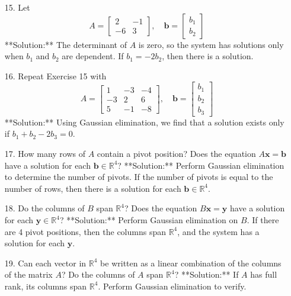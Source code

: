 \documentclass[12pt]{article}
\theoremstyle{definition}
\begin{document}
{\color{red}
\begin{enumerate}
    \item[15.] 
    Let 
    \[
    A = \begin{bmatrix} 2 & -1 \\ -6 & 3 \end{bmatrix}, \quad \mathbf{b} = \begin{bmatrix} b_1 \\ b_2 \end{bmatrix}
    \]
    **Solution:** The determinant of \( A \) is zero, so the system has solutions only when \( b_1 \) and \( b_2 \) are dependent. If \( b_1 = -2b_2 \), then there is a solution.
    
    \item[16.]
    Repeat Exercise 15 with 
    \[
    A = \begin{bmatrix} 1 & -3 & -4 \\ -3 & 2 & 6 \\ 5 & -1 & -8 \end{bmatrix}, \quad \mathbf{b} = \begin{bmatrix} b_1 \\ b_2 \\ b_3 \end{bmatrix}
    \]
    **Solution:** Using Gaussian elimination, we find that a solution exists only if \( b_1 + b_2 - 2b_3 = 0 \).

    \item[17.]
    How many rows of \( A \) contain a pivot position? Does the equation \( A\mathbf{x} = \mathbf{b} \) have a solution for each \( \mathbf{b} \in \mathbb{R}^4 \)?
    **Solution:** Perform Gaussian elimination to determine the number of pivots. If the number of pivots is equal to the number of rows, then there is a solution for each \( \mathbf{b} \in \mathbb{R}^4 \).
    
    \item[18.]
    Do the columns of \( B \) span \( \mathbb{R}^4 \)? Does the equation \( B\mathbf{x} = \mathbf{y} \) have a solution for each \( \mathbf{y} \in \mathbb{R}^4 \)?
    **Solution:** Perform Gaussian elimination on \( B \). If there are 4 pivot positions, then the columns span \( \mathbb{R}^4 \), and the system has a solution for each \( \mathbf{y} \).
    
    \item[19.] 
    Can each vector in \( \mathbb{R}^4 \) be written as a linear combination of the columns of the matrix \( A \)? Do the columns of \( A \) span \( \mathbb{R}^4 \)?
    **Solution:** If \( A \) has full rank, its columns span \( \mathbb{R}^4 \). Perform Gaussian elimination to verify.


\end{enumerate}}
\end{document}
